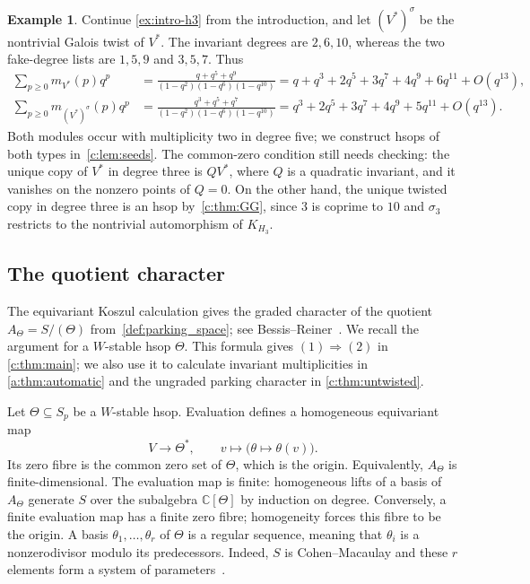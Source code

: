 \documentclass[11pt]{amsart}
\theoremstyle{definition}
\newtheorem{example}[theorem]{Example}
\newcommand{\C}{\mathbb C}\newcommand{\Q}{\mathbb Q}
\begin{document}
\begin{example}\label{ex:h3-multiplicity}
Continue \cref{ex:intro-h3} from the introduction, and let
$(V^*)^\sigma$ be the nontrivial Galois twist of $V^*$. The invariant degrees are
$2,6,10$, whereas the two fake-degree lists are $1,5,9$ and $3,5,7$.
Thus
\begin{align*}
 \sum_{p\ge0}m_{V^*}(p)q^p
 &=\frac{q+q^5+q^9}{(1-q^2)(1-q^6)(1-q^{10})}
   =q+q^3+2q^5+3q^7+4q^9+6q^{11}+O(q^{13}),\\
 \sum_{p\ge0}m_{(V^*)^\sigma}(p)q^p
 &=\frac{q^3+q^5+q^7}{(1-q^2)(1-q^6)(1-q^{10})}
   =q^3+2q^5+3q^7+4q^9+5q^{11}+O(q^{13}).
\end{align*}
Both modules occur with multiplicity two in degree five; we construct
hsops of both types in~\cref{c:lem:seeds}. The common-zero condition
still needs checking: the unique copy of $V^*$ in degree three is
$QV^*$, where $Q$ is a quadratic invariant, and it vanishes on the
nonzero points of $Q=0$. On the other hand, the unique twisted copy in degree three is
an hsop by~\cref{c:thm:GG}, since $3$ is coprime to $10$ and
$\sigma_3$ restricts to the nontrivial automorphism of $K_{H_3}$.
\end{example}

\subsection{The quotient character}\label{b:sec:quotient-character}

The equivariant Koszul calculation gives the graded character
of the quotient $A_\Theta=S/(\Theta)$ from~\cref{def:parking_space}; see
Bessis--Reiner~\cite[Proposition~4.2 and its proof]{BR}.
We recall the argument for a $W$-stable hsop $\Theta$.
This formula gives
$(1)\Rightarrow(2)$ in \cref{c:thm:main}; we also use it to calculate
invariant multiplicities in \cref{a:thm:automatic} and the ungraded
parking character in \cref{c:thm:untwisted}.

Let $\Theta\subseteq S_p$ be a $W$-stable hsop. Evaluation defines a
homogeneous equivariant map
\[
 V\longrightarrow\Theta^*,\qquad
 v\longmapsto\bigl(\theta\longmapsto\theta(v)\bigr).
\]
Its zero fibre is the common zero set of $\Theta$, which is the
origin. Equivalently, $A_\Theta$ is finite-dimensional. The evaluation
map is finite: homogeneous lifts of a basis of $A_\Theta$ generate
$S$ over the subalgebra $\C[\Theta]$ by induction on degree.
Conversely, a finite evaluation map has a finite zero fibre; homogeneity
forces this fibre to be the origin.
A basis $\theta_1,\ldots,\theta_r$ of $\Theta$ is a regular sequence,
meaning that $\theta_i$ is a nonzerodivisor modulo its predecessors.
Indeed, $S$ is Cohen--Macaulay and these $r$ elements form a system
of parameters~\cite[Lemmas~10.104.2 and~10.104.7]{Stacks}.
\end{document}
